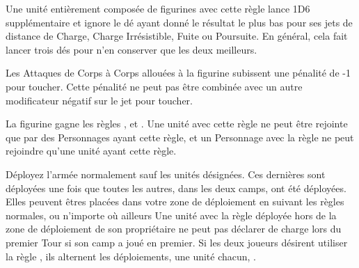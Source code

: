 
Une unité entièrement composée de figurines avec cette règle lance 1D6 supplémentaire et ignore le dé ayant donné le résultat le plus bas pour ses jets de distance de Charge, Charge Irrésistible, Fuite ou Poursuite. En général, cela fait lancer trois dés pour n'en conserver que les deux meilleurs.


Les Attaques de Corps à Corps allouées à la figurine subissent une pénalité de -1 pour toucher. Cette pénalité ne peut pas être combinée avec un autre modificateur négatif sur le jet pour toucher.


La figurine gagne les règles \magicalattacks{}, \immunetopsychology{} et . Une unité avec cette règle ne peut être rejointe que par des Personnages ayant cette règle, et un Personnage avec la règle \otherworldly{} ne peut rejoindre qu'une unité ayant cette règle.


 Déployez l'armée normalement sauf les unités désignées. Ces dernières sont déployées une fois que toutes les autres, dans les deux camps, ont été déployées. Elles peuvent êtres placées dans votre zone de déploiement en suivant les règles normales, ou n'importe où ailleurs  Une unité avec la règle \scout{} déployée hors de la zone de déploiement de son propriétaire ne peut pas déclarer de charge lors du premier Tour si son camp a joué en premier. Si les deux joueurs désirent utiliser la règle \scout{}, ils alternent les déploiements, une unité chacun, .



